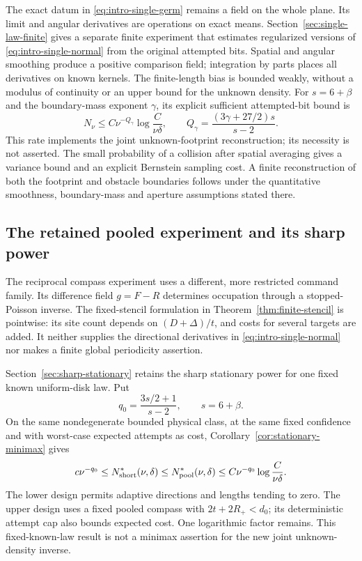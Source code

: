 The exact datum in \eqref{eq:intro-single-germ} remains a field on the
whole plane. Its limit and angular derivatives are operations on exact
means. Section~\ref{sec:single-law-finite} gives a separate finite
experiment that estimates regularized versions of
\eqref{eq:intro-single-normal} from the original attempted bits.
Spatial and angular smoothing produce a positive comparison field;
integration by parts places all derivatives on known kernels. The
finite-length bias is bounded weakly, without a modulus of continuity
or an upper bound for the unknown density.
For $s=6+\beta$ and the boundary-mass exponent $\gamma$, its
explicit sufficient attempted-bit bound is
\begin{equation}\label{eq:intro-single-finite-cost}
 N_\nu\le C\nu^{-Q_\gamma}\log\frac{C}{\nu\delta},
 \qquad Q_\gamma=\frac{(3\gamma+27/2)s}{s-2}.
\end{equation}
This rate implements the joint unknown-footprint reconstruction;
its necessity is not asserted.
 The small probability of a
collision after spatial averaging gives a variance bound and an
explicit Bernstein sampling cost. A finite reconstruction of both
the footprint and obstacle boundaries follows under the quantitative
smoothness, boundary-mass and aperture assumptions stated there.

\subsection{The retained pooled experiment and its sharp power}
The reciprocal compass experiment uses a different, more restricted
command family. Its difference field $g=F-R$ determines occupation
through a stopped-Poisson inverse. The fixed-stencil formulation in
Theorem~\ref{thm:finite-stencil} is pointwise: its site count depends
on $(D+\Delta)/t$, and costs for several targets are added. It neither
supplies the directional derivatives in \eqref{eq:intro-single-normal}
nor makes a finite global periodicity assertion.

Section~\ref{sec:sharp-stationary} retains the sharp stationary power
for one fixed known uniform-disk law. Put
\[
                    q_0=\frac{3s/2+1}{s-2},\qquad s=6+\beta.
\]
On the same nondegenerate bounded physical class, at the same fixed
confidence and with worst-case expected attempts as cost,
Corollary~\ref{cor:stationary-minimax} gives
\begin{equation}\label{eq:intro-single-benchmark}
 c\nu^{-q_0}\le N^*_{\rm short}(\nu,\delta)
       \le N^*_{\rm pool}(\nu,\delta)
       \le C\nu^{-q_0}\log\frac{C}{\nu\delta}.
\end{equation}
The lower design permits adaptive directions and lengths tending to
zero. The upper design uses a fixed pooled compass with
$2t+2R_+<d_0$; its deterministic attempt cap also bounds expected
cost. One logarithmic factor remains. This fixed-known-law result is
not a minimax assertion for the new joint unknown-density inverse.

